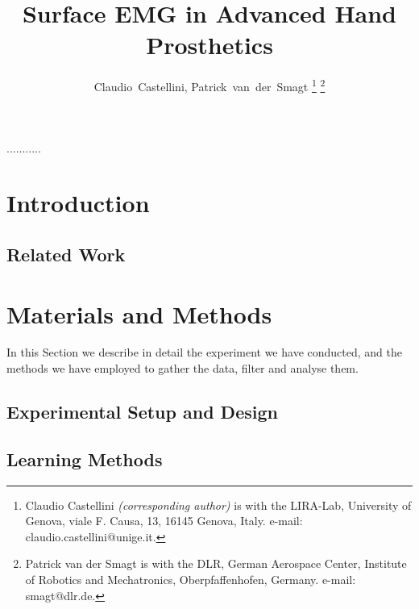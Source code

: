 \documentclass[journal]{IEEEtran}
\begin{document}
\title{Surface EMG in Advanced Hand Prosthetics}

\author{Claudio~Castellini, Patrick~van~der~Smagt
\thanks{Claudio Castellini \emph{(corresponding author)}
  is with the LIRA-Lab, University of Genova,
  viale F. Causa, 13, 16145 Genova, Italy.
  e-mail: claudio.castellini@unige.it.}%
\thanks{Patrick van der Smagt is with the DLR, German Aerospace Center,
  Institute of Robotics and Mechatronics, Oberpfaffenhofen, Germany.
  e-mail: smagt@dlr.de.}%
}

\maketitle

\begin{abstract}
  
\end{abstract}

\begin{IEEEkeywords}
...........
\end{IEEEkeywords}

\IEEEpeerreviewmaketitle

\section{Introduction}
\label{sec:introduction}


\subsection{Related Work}
\label{subsec:relatedwork}


\section{Materials and Methods}
\label{sec:m&ms}

In this Section we describe in detail the experiment we have
conducted, and the methods we have employed to gather the data, filter
and analyse them.

\subsection{Experimental Setup and Design}
\label{subsec:setup}


\subsection{Learning Methods}
\label{subsec:analysis}

\end{document}
